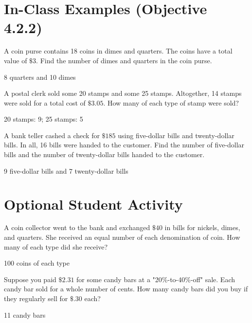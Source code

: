 \documentclass{ximera}
\begin{document}
\section*{In-Class Examples (Objective 4.2.2)}

\begin{problem}
A coin purse contains 18 coins in dimes and quarters. The coins have a total value of $\$ 3$. Find the number of dimes and quarters in the coin purse.
\begin{solution}
8 quarters and 10 dimes
\end{solution}
\end{problem}

\begin{problem}
A postal clerk sold some 20\textcent{} stamps and some 25\textcent{} stamps. Altogether, 14 stamps were sold for a total cost of $\$ 3.05$. How many of each type of stamp were sold?
\begin{solution}
20\textcent{} stamps: 9; 25\textcent{} stamps: 5
\end{solution}
\end{problem}

\begin{problem}
A bank teller cashed a check for $\$ 185$ using five-dollar bills and twenty-dollar bills. In all, 16 bills were handed to the customer. Find the number of five-dollar bills and the number of twenty-dollar bills handed to the customer.
\begin{solution}
9 five-dollar bills and 7 twenty-dollar bills
\end{solution}
\end{problem}

\section*{Optional Student Activity}

\begin{exercise}
A coin collector went to the bank and exchanged $\$ 40$ in bills for nickels, dimes, and quarters. She received an equal number of each denomination of coin. How many of each type did she receive?
\begin{solution}
100 coins of each type
\end{solution}
\end{exercise}

\begin{exercise}
Suppose you paid $\$ 2.31$ for some candy bars at a "20\%-to-40\%-off" sale. Each candy bar sold for a whole number of cents. How many candy bars did you buy if they regularly sell for $\$ .30$ each?
\begin{solution}
11 candy bars
\end{solution}
\end{exercise}
\end{document}
